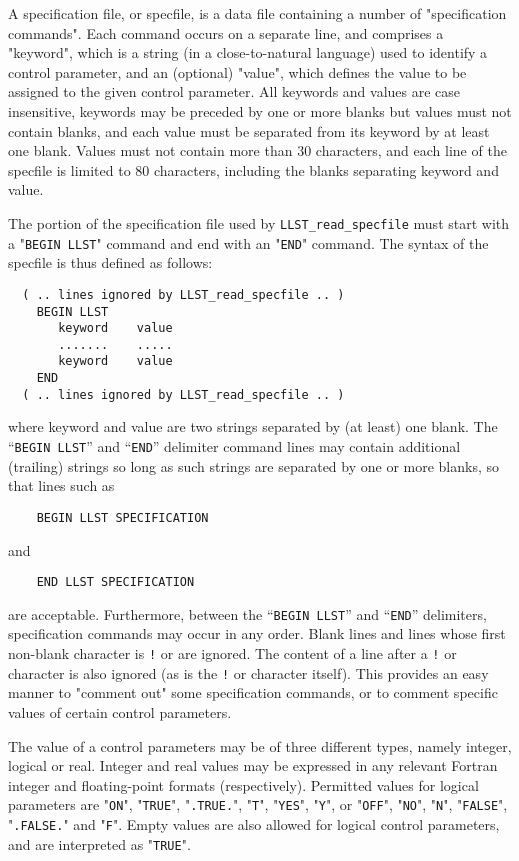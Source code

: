 \documentclass{galahad}
\newcommand{\packagename}{LLST}
\begin{document}
A specification file, or specfile, is a data file containing a number of 
"specification commands". Each command occurs on a separate line, 
and comprises a "keyword", 
which is a string (in a close-to-natural language) used to identify a 
control parameter, and 
an (optional) "value", which defines the value to be assigned to the given
control parameter. All keywords and values are case insensitive, 
keywords may be preceded by one or more blanks but
values must not contain blanks, and
each value must be separated from its keyword by at least one blank.
Values must not contain more than 30 characters, and 
each line of the specfile is limited to 80 characters,
including the blanks separating keyword and value.

The portion of the specification file used by 
{\tt \packagename\_read\_specfile}
must start
with a "{\tt BEGIN \packagename}" command and end with an 
"{\tt END}" command.  The syntax of the specfile is thus defined as follows:
\begin{verbatim}
  ( .. lines ignored by LLST_read_specfile .. )
    BEGIN LLST
       keyword    value
       .......    .....
       keyword    value
    END 
  ( .. lines ignored by LLST_read_specfile .. )
\end{verbatim}
where keyword and value are two strings separated by (at least) one blank.
The ``{\tt BEGIN \packagename}'' and ``{\tt END}'' delimiter command lines 
may contain additional (trailing) strings so long as such strings are 
separated by one or more blanks, so that lines such as
\begin{verbatim}
    BEGIN LLST SPECIFICATION
\end{verbatim}
and
\begin{verbatim}
    END LLST SPECIFICATION
\end{verbatim}
are acceptable. Furthermore, 
between the
``{\tt BEGIN \packagename}'' and ``{\tt END}'' delimiters,
specification commands may occur in any order.  Blank lines and
lines whose first non-blank character is {\tt !} or {\tt *} are ignored. 
The content 
of a line after a {\tt !} or {\tt *} character is also 
ignored (as is the {\tt !} or {\tt *}
character itself). This provides an easy manner to "comment out" some 
specification commands, or to comment specific values 
of certain control parameters.  

The value of a control parameters may be of three different types, namely
integer, logical or real.
Integer and real values may be expressed in any relevant Fortran integer and
floating-point formats (respectively). Permitted values for logical
parameters are "{\tt ON}", "{\tt TRUE}", "{\tt .TRUE.}", "{\tt T}", 
"{\tt YES}", "{\tt Y}", or "{\tt OFF}", "{\tt NO}",
"{\tt N}", "{\tt FALSE}", "{\tt .FALSE.}" and "{\tt F}". 
Empty values are also allowed for 
logical control parameters, and are interpreted as "{\tt TRUE}".  
\end{document}
